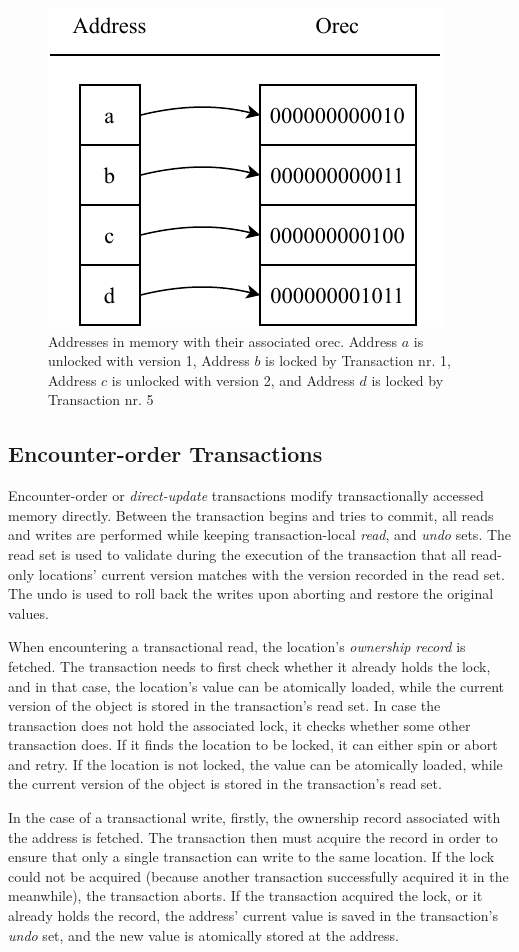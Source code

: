 \begin{figure}[!htb]
    \centering
    \includegraphics[width=.5\textwidth]{images/orec.pdf}
    \caption{Addresses in memory with their associated orec. Address $a$ is unlocked with version 1, Address $b$ is locked by Transaction nr. 1, Address $c$ is unlocked with version 2, and Address $d$ is locked by Transaction nr. 5}
    \label{fig:orec}
\end{figure}

\subsection{Encounter-order Transactions}
\label{subsection:etx}
Encounter-order or \textit{direct-update} transactions modify transactionally accessed memory directly. Between the transaction begins and tries to commit, all reads and writes are performed while keeping transaction-local \textit{read}, and \textit{undo} sets. The read set is used to validate during the execution of the transaction that all read-only locations' current version matches with the version recorded in the read set. The undo is used to roll back the writes upon aborting and restore the original values.

When encountering a transactional read, the location's \textit{ownership record} is fetched. The transaction needs to first check whether it already holds the lock, and in that case, the location's value can be atomically loaded, while the current version of the object is stored in the transaction's read set. In case the transaction does not hold the associated lock, it checks whether some other transaction does. If it finds the location to be locked, it can either spin or abort and retry. If the location is not locked, the value can be atomically loaded, while the current version of the object is stored in the transaction's read set.

In the case of a transactional write, firstly, the ownership record associated with the address is fetched. The transaction then must acquire the record in order to ensure that only a single transaction can write to the same location. If the lock could not be acquired (because another transaction successfully acquired it in the meanwhile), the transaction aborts. If the transaction acquired the lock, or it already holds the record, the address' current value is saved in the transaction's \textit{undo} set, and the new value is atomically stored at the address.

